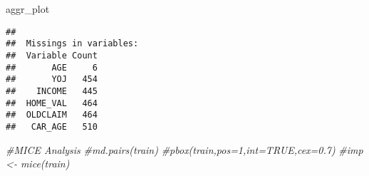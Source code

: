 \documentclass[]{article}
\newenvironment{Shaded}{\begin{snugshade}}{\end{snugshade}}
\newcommand{\CommentTok}[1]{\textcolor[rgb]{0.56,0.35,0.01}{\textit{#1}}}
\newcommand{\NormalTok}[1]{#1}
\begin{document}
\begin{Shaded}
\begin{Highlighting}[]
\NormalTok{aggr_plot}
\end{Highlighting}
\end{Shaded}

\begin{verbatim}
## 
##  Missings in variables:
##  Variable Count
##       AGE     6
##       YOJ   454
##    INCOME   445
##  HOME_VAL   464
##  OLDCLAIM   464
##   CAR_AGE   510
\end{verbatim}

\begin{Shaded}
\begin{Highlighting}[]
\CommentTok{#MICE Analysis}
\CommentTok{#md.pairs(train)}
\CommentTok{#pbox(train,pos=1,int=TRUE,cex=0.7)}
\CommentTok{#imp <- mice(train)}
\end{Highlighting}
\end{Shaded}
\end{document}
